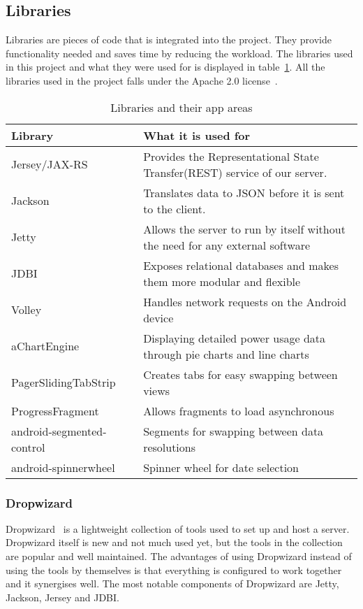 \subsection{Libraries}
\label{sec:libraries}
Libraries are pieces of code that is integrated into the project. They provide functionality needed and saves time by reducing the workload. The libraries used in this project and what they were used for is displayed in table~\ref{tab:libs}.
 All the libraries used in the project falls under the Apache 2.0 license~\cite{apache}.

\begin{table}[H]
\begin{tabular}{|l|p{10.4cm}|}
\hline
\textbf{Library }& \textbf{What it is used for}\\\hline
Jersey/JAX-RS~\cite{jersey} & Provides the Representational State Transfer(REST) service of our server.\\\hline
Jackson~\cite{jackson}&Translates data to \gls{JSON} before it is sent to the client.\\\hline
Jetty~\cite{jetty}&Allows the server to run by itself without the need for any external software\\\hline
JDBI~\cite{jdbi}&Exposes relational databases and makes them more modular and flexible\\\hline
Volley~\cite{volley}& Handles network requests on the Android device\\\hline
aChartEngine~\cite{achart}& Displaying detailed power usage data through  pie charts and line charts\\\hline
PagerSlidingTabStrip~\cite{psts}& Creates tabs for easy swapping between views\\\hline
ProgressFragment~\cite{progressfragment}& Allows fragments to load asynchronous\\\hline
android-segmented-control~\cite{segments}& Segments for swapping between data resolutions\\\hline
android-spinnerwheel\cite{spinnerwheel}& Spinner wheel for date selection\\\hline
\end{tabular}
\caption{Libraries and their app areas}
\label{tab:libs}
\end{table}


\subsubsection{Dropwizard}
Dropwizard~\cite{dropwizard} is a lightweight collection of tools used to set up and host a server. Dropwizard itself is new and not much used yet, but the tools in the collection are popular and well maintained. 
The advantages of using Dropwizard instead of using the tools by themselves is that everything is configured to work together and it synergises well. The most notable components of Dropwizard are Jetty, Jackson, Jersey and JDBI.

